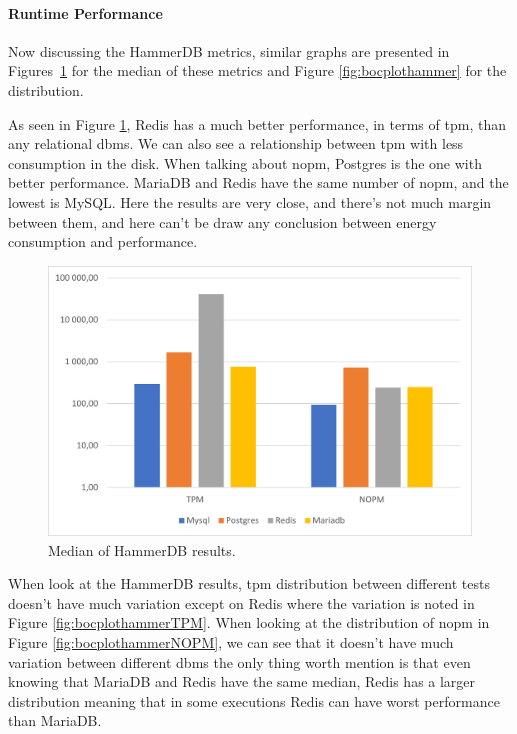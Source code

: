 
\paragraph{Runtime Performance}
Now discussing the HammerDB metrics, similar graphs are presented in Figures~\ref{fig:medianhammerdb} for the median of these metrics and Figure \ref{fig:bocplothammer} for the distribution.

As seen in Figure \ref{fig:medianhammerdb}, Redis has a much better performance, in terms of \gls{tpm}, than any relational \gls{dbms}. We can also see a relationship between \gls{tpm} with less consumption in the disk.
When talking about \gls{nopm}, Postgres is the one with better performance.
MariaDB and Redis have the same number of \gls{nopm}, and the lowest is MySQL. Here the results are very close, and there's not much margin between them, and here can't be draw any conclusion between energy consumption and performance.



\begin{figure}[H]
\centering
    \includegraphics[width=0.8\columnwidth]{results/median/hammerdb.png}
\caption{Median of HammerDB results.}
\label{fig:medianhammerdb}
\end{figure}


When look at the HammerDB results, \gls{tpm} distribution between different tests doesn't have much variation except on Redis where the variation is noted  in Figure \ref{fig:bocplothammerTPM}. 
When looking at the distribution of \gls{nopm} in Figure \ref{fig:bocplothammerNOPM}, we can see that it doesn't have much variation between different \gls{dbms} the only thing worth mention is that even knowing that MariaDB and Redis have the same median, Redis has a larger distribution meaning that in some executions Redis can have worst performance than MariaDB.

